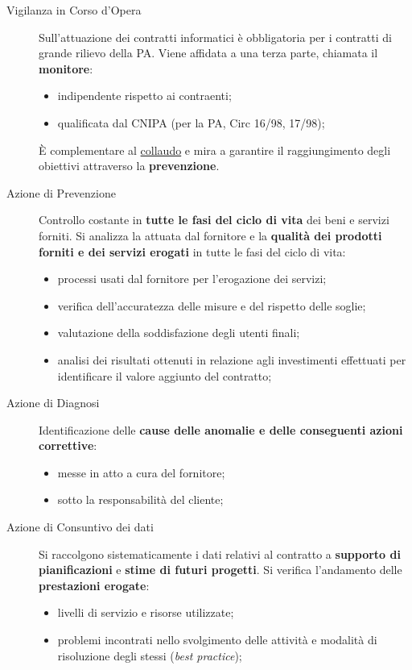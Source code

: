 \documentclass{article}
\begin{document}
\begin{description}
    \item[Vigilanza in Corso d'Opera] Sull'attuazione dei contratti informatici è obbligatoria per i contratti di grande rilievo della PA.
        Viene affidata a una terza parte, chiamata il \textbf{monitore}:
        \begin{itemize}
            \item indipendente rispetto ai contraenti;
            \item qualificata dal CNIPA (per la PA, Circ 16/98, 17/98);
        \end{itemize}
        È complementare al \hyperref[sub:collaudo]{collaudo} e mira a garantire il raggiungimento degli obiettivi attraverso la \textbf{prevenzione}.
    \item[Azione di Prevenzione] Controllo costante in \textbf{tutte le fasi del ciclo di vita} dei beni e servizi forniti.
        Si analizza la  attuata dal fornitore e la \textbf{qualità dei prodotti forniti e dei servizi erogati} in tutte le fasi del ciclo di vita:
        \begin{itemize}
            \item processi usati dal fornitore per l'erogazione dei servizi;
            \item verifica dell'accuratezza delle misure e del rispetto delle soglie;
            \item valutazione della soddisfazione degli utenti finali;
            \item analisi dei risultati ottenuti in relazione agli investimenti effettuati per identificare il valore aggiunto del contratto;
        \end{itemize}
    \item[Azione di Diagnosi] Identificazione delle \textbf{cause delle anomalie e delle conseguenti azioni correttive}:
        \begin{itemize}
            \item messe in atto a cura del fornitore;
            \item sotto la responsabilità del cliente;
        \end{itemize}
    \item[Azione di Consuntivo dei dati] Si raccolgono sistematicamente i dati relativi al contratto a \textbf{supporto di pianificazioni} e \textbf{stime di futuri progetti}.
        Si verifica l'andamento delle \textbf{prestazioni erogate}:
        \begin{itemize}
            \item livelli di servizio e risorse utilizzate;
            \item problemi incontrati nello svolgimento delle attività e modalità di risoluzione degli stessi (\textit{best practice});
        \end{itemize}
\end{description}
\end{document}
